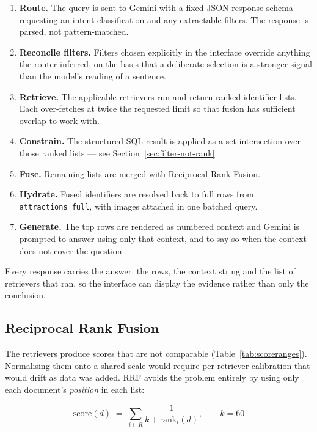 \documentclass[11pt,a4paper]{article}
\begin{document}
\begin{enumerate}[itemsep=2pt]
  \item \textbf{Route.} The query is sent to Gemini with a fixed JSON response
        schema requesting an intent classification and any extractable filters.
        The response is parsed, not pattern-matched.
  \item \textbf{Reconcile filters.} Filters chosen explicitly in the interface
        override anything the router inferred, on the basis that a deliberate
        selection is a stronger signal than the model's reading of a sentence.
  \item \textbf{Retrieve.} The applicable retrievers run and return ranked
        identifier lists. Each over-fetches at twice the requested limit so that
        fusion has sufficient overlap to work with.
  \item \textbf{Constrain.} The structured SQL result is applied as a set
        intersection over those ranked lists --- see
        Section~\ref{sec:filter-not-rank}.
  \item \textbf{Fuse.} Remaining lists are merged with Reciprocal Rank Fusion.
  \item \textbf{Hydrate.} Fused identifiers are resolved back to full rows from
        \texttt{attractions\_full}, with images attached in one batched query.
  \item \textbf{Generate.} The top rows are rendered as numbered context and
        Gemini is prompted to answer using only that context, and to say so when
        the context does not cover the question.
\end{enumerate}

Every response carries the answer, the rows, the context string and the list of
retrievers that ran, so the interface can display the evidence rather than only
the conclusion.

\subsection{Reciprocal Rank Fusion}

The retrievers produce scores that are not comparable
(Table~\ref{tab:scoreranges}). Normalising them onto a shared scale would
require per-retriever calibration that would drift as data was added. RRF
avoids the problem entirely by using only each document's \emph{position} in
each list:

\begin{equation}
\mathrm{score}(d) \;=\; \sum_{i \in R} \frac{1}{k + \mathrm{rank}_i(d)},
\qquad k = 60
\end{equation}
\end{document}
